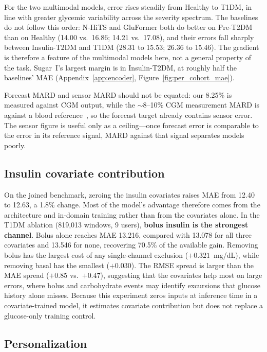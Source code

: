 \documentclass[11pt,a4paper]{article}
\begin{document}
For the two multimodal models, error rises steadily from Healthy to T1DM, in line with greater glycemic variability across the severity spectrum.
The baselines do not follow this order: N-HiTS and GluFormer both do better on Pre-T2DM than on Healthy (14.00 vs.\ 16.86; 14.21 vs.\ 17.08), and their errors fall sharply between Insulin-T2DM and T1DM (28.31 to 15.53; 26.36 to 15.46).
The gradient is therefore a feature of the multimodal models here, not a general property of the task.
Sugar~I's largest margin is in Insulin-T2DM, at roughly half the baselines' MAE (Appendix~\ref{app:encoder}, Figure~\ref{fig:per_cohort_mae}).

Forecast MARD and sensor MARD should not be equated: our 8.25\% is measured against CGM output, while the $\sim$8--10\% CGM measurement MARD is against a blood reference~\citep{garg2022dexcomg7}, so the forecast target already contains sensor error.
The sensor figure is useful only as a ceiling---once forecast error is comparable to the error in its reference signal, MARD against that signal separates models poorly.

\subsection{Insulin covariate contribution}
\label{sec:covariate_results}

On the joined benchmark, zeroing the insulin covariates raises MAE from 12.40 to 12.63, a 1.8\% change.
Most of the model's advantage therefore comes from the architecture and in-domain training rather than from the covariates alone.
In the T1DM ablation (819,013 windows, 9 users), \textbf{bolus insulin is the strongest channel}.
Bolus alone reaches MAE 13.216, compared with 13.078 for all three covariates and 13.546 for none, recovering 70.5\% of the available gain.
Removing bolus has the largest cost of any single-channel exclusion ($+0.321$~mg/dL), while removing basal has the smallest ($+0.030$).
The RMSE spread is larger than the MAE spread ($+0.85$ vs.\ $+0.47$), suggesting that the covariates help most on large errors, where bolus and carbohydrate events may identify excursions that glucose history alone misses.
Because this experiment zeros inputs at inference time in a covariate-trained model, it estimates covariate contribution but does not replace a glucose-only training control.



\subsection{Personalization}
\label{sec:personalization_results}
\end{document}
